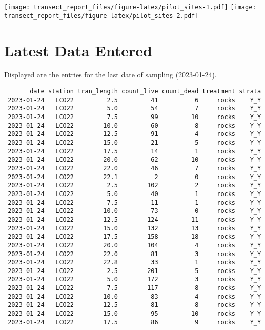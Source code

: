 \documentclass[
]{article}
\begin{document}
\texttt{[image: transect\_report\_files/figure-latex/pilot\_sites-1.pdf]}
\texttt{[image: transect\_report\_files/figure-latex/pilot\_sites-2.pdf]}
\newpage

\hypertarget{latest-data-entered}{%
\section{Latest Data Entered}\label{latest-data-entered}}

Displayed are the entries for the last date of sampling (2023-01-24).

\begin{verbatim}
       date station tran_length count_live count_dead treatment strata
 2023-01-24   LCO22         2.5         41          6     rocks    Y_Y
 2023-01-24   LCO22         5.0         54          7     rocks    Y_Y
 2023-01-24   LCO22         7.5         99         10     rocks    Y_Y
 2023-01-24   LCO22        10.0         60          8     rocks    Y_Y
 2023-01-24   LCO22        12.5         91          4     rocks    Y_Y
 2023-01-24   LCO22        15.0         21          5     rocks    Y_Y
 2023-01-24   LCO22        17.5         14          1     rocks    Y_Y
 2023-01-24   LCO22        20.0         62         10     rocks    Y_Y
 2023-01-24   LCO22        22.0         46          7     rocks    Y_Y
 2023-01-24   LCO22        22.1          2          0     rocks    Y_Y
 2023-01-24   LCO22         2.5        102          2     rocks    Y_Y
 2023-01-24   LCO22         5.0         40          1     rocks    Y_Y
 2023-01-24   LCO22         7.5         11          1     rocks    Y_Y
 2023-01-24   LCO22        10.0         73          0     rocks    Y_Y
 2023-01-24   LCO22        12.5        124         11     rocks    Y_Y
 2023-01-24   LCO22        15.0        132         13     rocks    Y_Y
 2023-01-24   LCO22        17.5        158         18     rocks    Y_Y
 2023-01-24   LCO22        20.0        104          4     rocks    Y_Y
 2023-01-24   LCO22        22.0         81          3     rocks    Y_Y
 2023-01-24   LCO22        22.8         33          1     rocks    Y_Y
 2023-01-24   LCO22         2.5        201          5     rocks    Y_Y
 2023-01-24   LCO22         5.0        172          3     rocks    Y_Y
 2023-01-24   LCO22         7.5        117          8     rocks    Y_Y
 2023-01-24   LCO22        10.0         83          4     rocks    Y_Y
 2023-01-24   LCO22        12.5         81          8     rocks    Y_Y
 2023-01-24   LCO22        15.0         95         10     rocks    Y_Y
 2023-01-24   LCO22        17.5         86          9     rocks    Y_Y

\end{verbatim}
\end{document}
